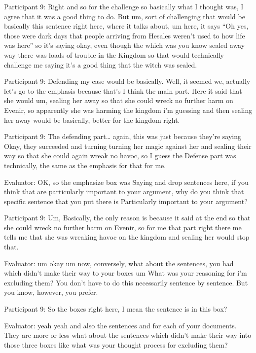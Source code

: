 \documentclass{l4proj}
\begin{document}
\begin{appendices}
 

Participant 9: Right and so for the challenge so basically what I thought was, I agree that it was a good thing to do. But um, sort of challenging that would be basically this sentence right here, where it talks about, um here, it says “Oh yes, those were dark days that people arriving from Hesales weren’t used to how life was here” so it's saying okay, even though the which was you know sealed away way there was loads of trouble in the Kingdom so that would technically challenge me saying it's a good thing that the witch was sealed. 

 

Participant 9: Defending my case would be basically. Well, it seemed we, actually let's go to the emphasis because that's I think the main part. Here it said that she would um, sealing her away so that she could wreck no further harm on Evenir, so apparently she was harming the kingdom i'm guessing and then sealing her away would be basically, better for the kingdom right.

 

Participant 9: The defending part… again, this was just because they're saying Okay, they succeeded and turning turning her magic against her and sealing their way so that she could again wreak no havoc, so I guess the Defense part was technically, the same as the emphasis for that for me.

 

Evaluator: OK, so the emphasize box was Saying and drop sentences here, if you think that are particularly important to your argument, why do you think that specific sentence that you put there is Particularly important to your argument?

Participant 9: Um, Basically, the only reason is because it said at the end so that she could wreck no further harm on Evenir, so for me that part right there me tells me that she was wreaking havoc on the kingdom and sealing her would stop that.

Evaluator: um okay um now, conversely, what about the sentences, you had which didn't make their way to your boxes um What was your reasoning for i'm excluding them? You don’t have to do this necessarily sentence by sentence. But you know, however, you prefer.

Participant 9: So the boxes right here, I mean the sentence is in this box?

Evaluator: yeah yeah and also the sentences and for each of your documents. They are more or less what about the sentences which didn't make their way into those three boxes like what was your thought process for excluding them?


\end{appendices}
\end{document}
